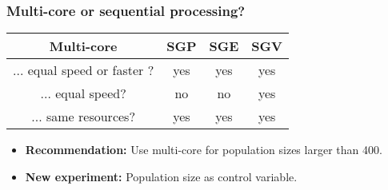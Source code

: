 \begin{frame}
\frametitle{
Multi-core or sequential processing?
}
\begin{center}
\begin{tabular}{c|ccc}
\hline
  Multi-core             & SGP & SGE & SGV \\
\hline
  ... equal speed or faster ?  & yes & yes & yes \\
  ... equal speed?       &  no &  no & yes \\
  ... same resources?    & yes & yes & yes \\
\hline
\end{tabular}
\end{center}
 
\vspace{2mm} 
\begin{itemize}
\item {\bf Recommendation:} Use multi-core for 
       population sizes larger than 400.
\item {\bf New experiment:} Population size as control variable.
\end{itemize}
\end{frame}